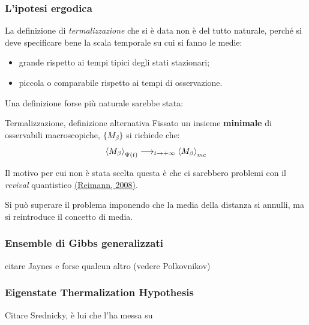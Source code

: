 \documentclass{beamer}
\theoremstyle{definition}
\theoremstyle{plain}
\begin{document}
\begin{frame}
	\transwipe
	\frametitle{L'ipotesi ergodica}
	\hypertarget{termdef2}{}
	
	
	La definizione di \textit{termalizzazione} che si è data non è del tutto naturale, perché si deve specificare bene la scala temporale su cui si fanno le medie: 
	\begin{itemize}
		\item grande rispetto ai tempi tipici degli stati stazionari;
		\item piccola o comparabile rispetto ai tempi di osservazione.
	\end{itemize}
	
	Una definizione forse più naturale sarebbe stata:
	\begin{block}{Termalizzazione, definizione alternativa}
		Fissato un insieme \textbf{minimale} di osservabili macroscopiche, $\{ M_\beta \}$ si richiede che:
		\begin{equation*}
		\expval{M_\beta}_{\Psi(t)} \longrightarrow_{t \rightarrow + \infty} \expval{M_\beta}_{mc}
		\end{equation*}
	\end{block}

	Il motivo per cui non è stata scelta questa è che ci sarebbero problemi con il \textit{revival} quantistico \hyperlink{bib}{(Reimann, 2008)}.
	
	Si può superare il problema imponendo che la media della distanza si annulli, ma si reintroduce il concetto di media.
\end{frame}

\begin{frame}
	\transwipe
	\frametitle{Ensemble di Gibbs generalizzati}
	\hypertarget{GGE}{}
	
	\hyperlink{overview}{}
	\alert{citare Jaynes e forse qualcun altro (vedere Polkovnikov)}
\end{frame}

\begin{frame}
	\transwipe
	\frametitle{Eigenstate Thermalization Hypothesis}
	\hypertarget{ETH}{}
	
	\hyperlink{overview}{}
	\alert{Citare Srednicky, è lui che l'ha messa su}
\end{frame}
\end{document}
